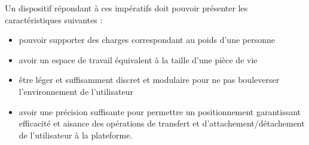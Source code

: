 Un dispositif répondant à ces impératifs doit pouvoir présenter les caractéristiques suivantes :
\begin{itemize}
 \item pouvoir supporter des charges correspondant au poids d'une personne
 \item avoir un espace de travail équivalent à la taille d'une pièce de vie
 \item être léger et suffisamment discret et modulaire pour ne pas bouleverser l'environnement de l'utilisateur
 \item avoir une précision suffisante pour permettre un positionnement garantissant efficacité et aisance des opérations de transfert et d'attachement/détachement de l'utilisateur à la plateforme.
\end{itemize}
















